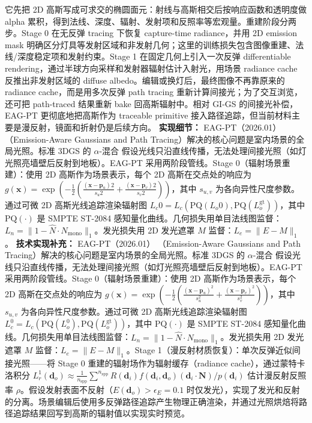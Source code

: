 它先把 2D 高斯写成可求交的椭圆面元：射线与高斯相交后按响应函数和透明度做 alpha 累积，得到法线、深度、辐射、发射项和反照率等宏观量。重建阶段分两步。Stage 0 在无反弹 tracing 下恢复 capture-time radiance，并用 2D emission mask 明确区分灯具等发射区域和非发射几何；这里的训练损失包含图像重建、法线/深度稳定项和发射约束。Stage 1 在固定几何上引入一次反弹 differentiable rendering，通过半球方向采样和发射器辐射估计入射光，用场景 radiance cache 反推出非发射区域的 diffuse albedo。编辑或换灯后，最终图像不再靠原来的 radiance cache，而是用多次反弹 path tracing 重新计算间接光；为了交互浏览，还可把 path-traced 结果重新 bake 回高斯辐射中。相对 GI-GS 的间接光补偿，EAG-PT 更彻底地把高斯作为 traceable primitive 接入路径追踪，但当前材料主要是漫反射，镜面和折射仍是后续方向。
\textbf{实现细节：} EAG-PT（2026.01） （Emission-Aware Gaussians and Path Tracing）解决的核心问题是室内场景的全局光照。标准 3DGS 的 $\alpha$-混合 假设光线只沿直线传播，无法处理间接光照（如灯光照亮墙壁后反射到地板）。EAG-PT 采用两阶段管线。Stage 0（辐射场景重建）：使用 2D 高斯作为场景表示，每个 2D 高斯在交点处的响应为 $g(\mathbf{x}) = \exp\left(-\frac{1}{2}\left(\frac{(\mathbf{x}-\mathbf{p}_u)^{}2}{s_u^{}2} + \frac{(\mathbf{x}-\mathbf{p}_v)^{}2}{s_v^{}2}\right)\right)$，其中 $s_{u,v}$ 为各向异性尺度参数。通过可微 2D 高斯光线追踪渲染辐射图 $L_c^{}0 = L_c(\mathrm{PQ}(L_o^{}0), \mathrm{PQ}(L_o^{\mathrm{gt}}))$，其中 $\mathrm{PQ}(\cdot)$ 是 SMPTE ST-2084 感知量化曲线。几何损失用单目法线图监督：$L_n = \|1 - \hat{N} \cdot N_{\mathrm{mono}}\|_1$。发光损失用 2D 发光遮罩 $M$ 监督：$L_e = \|E - M\|_1$。
\textbf{技术实现补充：} EAG-PT（2026.01） （Emission-Aware Gaussians and Path Tracing）解决的核心问题是室内场景的全局光照。标准 3DGS 的 $\alpha$-混合 假设光线只沿直线传播，无法处理间接光照（如灯光照亮墙壁后反射到地板）。EAG-PT 采用两阶段管线。Stage 0（辐射场景重建）：使用 2D 高斯作为场景表示，每个 2D 高斯在交点处的响应为 $g(\mathbf{x}) = \exp\left(-\frac{1}{2}\left(\frac{(\mathbf{x}-\mathbf{p}_u)^2}{s_u^2} + \frac{(\mathbf{x}-\mathbf{p}_v)^2}{s_v^2}\right)\right)$，其中 $s_{u,v}$ 为各向异性尺度参数。通过可微 2D 高斯光线追踪渲染辐射图 $L_c^0 = L_c(\mathrm{PQ}(L_o^0), \mathrm{PQ}(L_o^{\mathrm{gt}}))$，其中 $\mathrm{PQ}(\cdot)$ 是 SMPTE ST-2084 感知量化曲线。几何损失用单目法线图监督：$L_n = \|1 - \hat{N} \cdot N_{\mathrm{mono}}\|_1$。发光损失用 2D 发光遮罩 $M$ 监督：$L_e = \|E - M\|_1$。Stage 1（漫反射材质恢复）：单次反弹近似间接光照——将 Stage 0 重建的辐射场作为辐射缓存（radiance cache），通过蒙特卡洛积分 $L_r^1(\mathbf{d}_o) \approx \frac{1}{n_{\mathrm{spp}}} \sum^{n_{\mathrm{spp}}} R(\mathbf{d}_i) f(\mathbf{d}_i, \mathbf{d}_o) (\mathbf{d}_i \cdot \mathbf{N}) / p(\mathbf{d}_i)$ 估计漫反射反照率 $\rho$。假设发射表面不反射（$E(\mathbf{d}_o) > \epsilon_E=0.1$ 时仅发光），实现了发光和反射的分离。场景编辑后使用多反弹路径追踪产生物理正确渲染，并通过光照烘焙将路径追踪结果回写到高斯的辐射值以实现实时预览。
